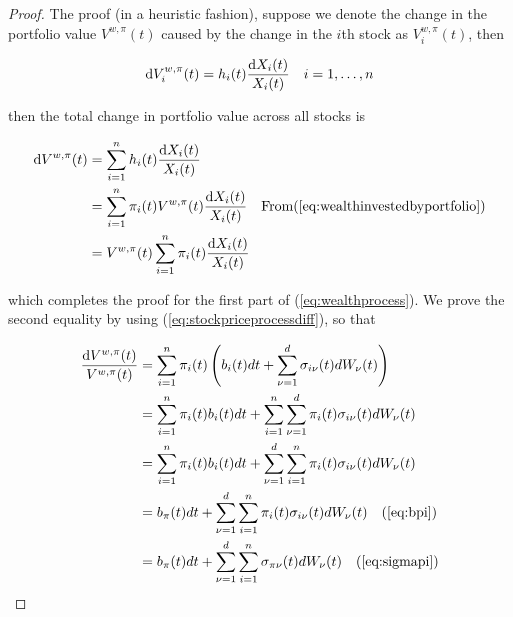 \documentclass[british]{amsart}
\numberwithin{equation}{section}
\numberwithin{figure}{section}
\theoremstyle{plain}
\theoremstyle{definition}
\theoremstyle{plain}
\theoremstyle{plain}
\theoremstyle{plain}
\theoremstyle{remark}
\theoremstyle{plain}
\renewcommand{\d}[1]{\mathop{\mathrm{d}{#1}}}
\begin{document}
\begin{proof}
	The proof (in a heuristic	fashion), suppose we denote the change in the portfolio
	value $V^{w,\pi}(t)$ caused by the change in the $i$th stock as $V_{i}^{w,\pi}(t)$,
	then

	\begin{equation*}
		\d{V_{i}^{w,\pi}(t)} = h_{i}(t) \frac{\d{X_{i}(t)}}{X_{i}(t)}
		\quad \rangei
	\end{equation*}

	then the total change in portfolio value across all stocks is

	\begin{gather*}
		\begin{split}
			\d{V^{w,\pi}(t)} 
					& = \sum_{i=1}^{n} h_{i}(t) \frac{\d{X_{i}(t)}}{X_{i}(t)} \\ 
					& = \sum_{i=1}^{n} \pi_{i}(t) V^{w,\pi}(t) \frac{\d{X_i(t)}}{X_i(t)} 
					\quad \text{From} (\ref{eq:wealthinvestedbyportfolio}) \\
					& = V^{w,\pi}(t) \sum_{i=1}^{n} \pi_{i}(t) \frac{\d{X_i(t)}}{X_i(t)} 
		\end{split}
	\end{gather*}

	which completes the proof for the first part of (\ref{eq:wealthprocess}). We
	prove the second equality by using (\ref{eq:stockpriceprocessdiff}), so that

	\begin{gather*}
		\begin{split}
			\frac{\d{V^{w,\pi}(t)}}{V^{w,\pi}(t)}
					& = \sum_{i=1}^{n} \pi_{i}(t) 
					\left(
						b_{i}(t)dt + \sum_{\nu=1}^{d} \sigma_{i\nu}(t) dW_{\nu}(t)
					\right) \\
					& = \sum_{i=1}^{n} \pi_{i}(t) b_{i}(t)dt + 
							\sum_{i=1}^{n} \sum_{\nu=1}^{d} \pi_{i}(t) \sigma_{i\nu}(t) dW_{\nu}(t) \\
					& = \sum_{i=1}^{n} \pi_{i}(t) b_{i}(t)dt + 
							\sum_{\nu=1}^{d} \sum_{i=1}^{n} \pi_{i}(t) \sigma_{i\nu}(t) dW_{\nu}(t) \\
					& = b_{\pi}(t)dt + 
							\sum_{\nu=1}^{d} \sum_{i=1}^{n} \pi_{i}(t) \sigma_{i\nu}(t) dW_{\nu}(t) 
					\quad (\ref{eq:bpi}) \\
					& = b_{\pi}(t)dt + 
							\sum_{\nu=1}^{d} \sum_{i=1}^{n} \sigma_{\pi\nu}(t) dW_{\nu}(t) 
					\quad (\ref{eq:sigmapi}) \\
		\end{split}
	\end{gather*}

\end{proof}
\end{document}
